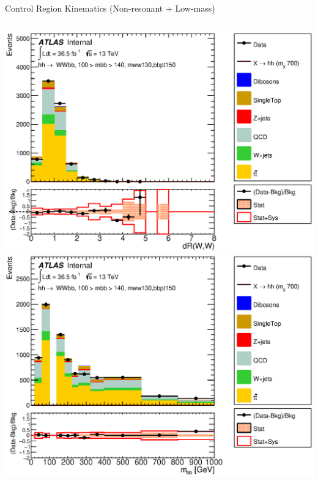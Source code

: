 \documentclass{beamer}
\begin{document}
{\begin{frame}{Control Region Kinematics (Non-resonant + Low-mass)}
\begin{columns}
      \includegraphics*[width=1.9\textwidth] {../chapters/dihiggs2/figures/ControlPlots/36ifb_CPUpdated_opt700_mBBcr_plots_094/C_mBBcr_opt700ichep_mww_bbpt150_drww_regionA_met25d020}\\
      \includegraphics*[width=1.9\textwidth] {../chapters/dihiggs2/figures/ControlPlots/36ifb_CPUpdated_opt700_mBBcr_plots_094/C_mBBcr_opt700ichep_mww_bbpt150_bbMass_regionA_met25d020}

\end{columns}
\end{frame}}
\end{document}
